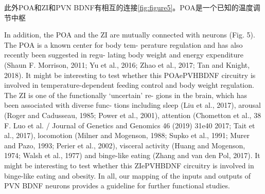 此外POA和ZI和PVN BDNF有相互的连接\figurename{\ref{fig:figure5}}。POA是一个已知的温度调节中枢


In addition, the POA and the ZI are mutually connected with  neurons (Fig. 5). The POA is a known center for body tem- perature regulation and has also recently been suggested in regu- lating body weight and energy expenditure (Shaun F. Morrison, 2011; Yu et al., 2016; Zhao et al., 2017; Tan and Knight, 2018). It might be interesting to test whether this POAePVHBDNF circuitry is involved in temperature-dependent feeding control and body weight regulation. The ZI is one of the functionally ‘uncertain’ re- gions in the brain, which has been associated with diverse func- tions including sleep (Liu et al., 2017), arousal (Roger and Cadusseau, 1985; Power et al., 2001), attention (Chometton et al.,
38 F. Luo et al. / Journal of Genetics and Genomics 46 (2019) 31e40
2017; Tait et al., 2017), locomotion (Milner and Mogenson, 1988; Supko et al., 1991; Murer and Pazo, 1993; Perier et al., 2002), visceral activity (Huang and Mogenson, 1974; Walsh et al., 1977) and binge-like eating (Zhang and van den Pol, 2017). It might be interesting to test whether this ZIePVHBDNF circuitry is involved in binge-like eating and obesity. In all, our mapping of the inputs and outputs of PVN BDNF neurons provides a guideline for further functional studies.


